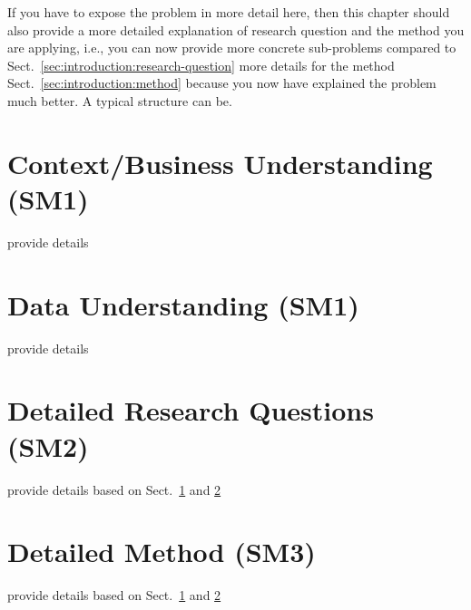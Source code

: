\documentclass[12pt,a4paper,footinclude=true,twoside,headinclude=true]{report}
\begin{document}
If you have to expose the problem in more detail here, then this chapter should also provide a more detailed explanation of research question and the method you are applying, i.e., you can now provide more concrete sub-problems compared to Sect.~\ref{sec:introduction:research-question} more details for the method Sect.~\ref{sec:introduction:method} because you now have explained the problem much better. A typical structure can be.

\section{Context/Business Understanding (SM1)}\label{sec:problem-exposition:context-understanding}

provide details

\section{Data Understanding (SM1)}\label{sec:problem-exposition:data-understanding}

provide details

\section{Detailed Research Questions (SM2)}\label{sec:problem-exposition:research-problems}

provide details based on Sect.~\ref{sec:problem-exposition:context-understanding} and  \ref{sec:problem-exposition:data-understanding} 

\section{Detailed Method (SM3)}\label{sec:problem-exposition:research-method}

provide details based on Sect.~\ref{sec:problem-exposition:context-understanding} and  \ref{sec:problem-exposition:data-understanding}
\end{document}
